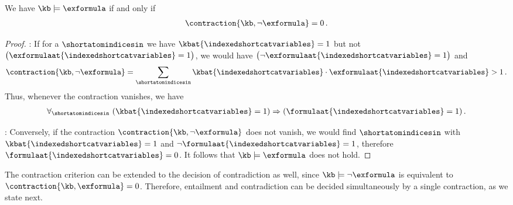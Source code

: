\begin{theorem}
    \label{the:contCriterionLogEntailment}
    We have $\kb\models\exformula$ if and only if
    \begin{align*}
        \contraction{\kb,\lnot\exformula} = 0 \, .
    \end{align*}
\end{theorem}
\begin{proof}
    \proofleftsymbol:
    If for a $\shortatomindicesin$ we have $\kbat{\indexedshortcatvariables}=1$ but not $\big(\exformulaat{\indexedshortcatvariables}=1\big)$, we would have $\big(\lnot\exformulaat{\indexedshortcatvariables}=1\big)$ and
    \begin{align*}
        \contraction{\kb,\lnot\exformula} =
        \sum_{\shortatomindicesin} \kbat{\indexedshortcatvariables} \cdot \exformulaat{\indexedshortcatvariables} > 1 \, .
    \end{align*}
    Thus, whenever the contraction vanishes, we have
    \begin{align*}
        \uniquantwrtof{\shortatomindicesin}{\imppremhead{\kbat{\indexedshortcatvariables}=1}{\formulaat{\indexedshortcatvariables}=1}} \, .
    \end{align*}

    \proofrightsymbol:
    Conversely, if the contraction $\contraction{\kb,\lnot\exformula}$ does not vanish, we would find $\shortatomindicesin$ with $\kbat{\indexedshortcatvariables}=1$ and $\lnot\formulaat{\indexedshortcatvariables}=1$, therefore $\formulaat{\indexedshortcatvariables}=0$.
    It follows that $\kb\models\exformula$ does not hold.
\end{proof}


The contraction criterion can be extended to the decision of contradiction as well, since $\kb\models\lnot\exformula$ is equivalent to $\contraction{\kb,\exformula}=0$.
Therefore, entailment and contradiction can be decided simultaneously by a single contraction, as we state next.

